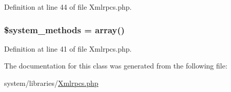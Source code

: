 Definition at line 44 of file Xmlrpcs.\-php.

\hypertarget{class_c_i___xmlrpcs_a07c837152d76c5e72b0bd7a065fa9c10}{
\subsubsection[{\$system\-\_\-methods}]{\setlength{\rightskip}{0pt plus 5cm}\$system\-\_\-methods = array()}}\label{class_c_i___xmlrpcs_a07c837152d76c5e72b0bd7a065fa9c10}


Definition at line 41 of file Xmlrpcs.\-php.



The documentation for this class was generated from the following file\-:\begin{DoxyCompactItemize}
\item 
system/libraries/\hyperlink{_xmlrpcs_8php}{Xmlrpcs.\-php}\end{DoxyCompactItemize}
